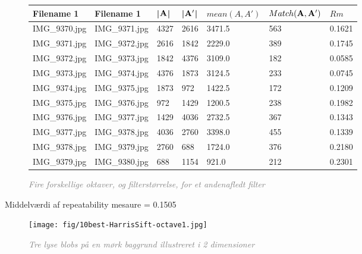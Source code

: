 \begin{figure}[H]
    \centering
    \begin{center}    
    \begin{tabular}{ | l | l | l | l | l | l | l |}
    \hline
    Filename 1 & Filename 1 & |$\bold{A}$| & |$\bold{A'}$| & $mean(A,A')$ & $Match(\bold{A}, \bold{A}')$ & $Rm$ \\ \hline
IMG\_9370.jpg &	IMG\_9371.jpg &	4327 &	2616 &	3471.5 &	563 &	0.1621\\ \hline
IMG\_9371.jpg &	IMG\_9372.jpg &	2616 &	1842 &	2229.0 &	389 &	0.1745\\ \hline
IMG\_9372.jpg &	IMG\_9373.jpg &	1842 &	4376 &	3109.0 &	182 &	0.0585\\ \hline
IMG\_9373.jpg &	IMG\_9374.jpg &	4376 &	1873 &	3124.5 &	233 &	0.0745\\ \hline
IMG\_9374.jpg &	IMG\_9375.jpg &	1873 &	972 &	1422.5 &	172 &	0.1209\\ \hline
IMG\_9375.jpg &	IMG\_9376.jpg &	972 &	1429 &	1200.5 &	238 &	0.1982\\ \hline
IMG\_9376.jpg &	IMG\_9377.jpg &	1429 &	4036 &	2732.5 &	367 &	0.1343\\ \hline
IMG\_9377.jpg &	IMG\_9378.jpg &	4036 &	2760 &	3398.0 &	455 &	0.1339\\ \hline
IMG\_9378.jpg &	IMG\_9379.jpg &	2760 &	688 &	1724.0 &	376 &	0.2180\\ \hline
IMG\_9379.jpg &	IMG\_9380.jpg &	688 &	1154 &	921.0  &	212 &	0.2301\\ \hline
    \end{tabular}       
    \caption{\textcolor{gray}{\footnotesize \textit{Fire forskellige oktaver, og filterstørrelse, for et andenafledt filter}}}
    \label{tab:HARRISOCTAVE2}
     \end{center}
     \vspace{-2.5em}
\end{figure} \noindent
Middelværdi af repeatability mesaure  = 0.1505


\begin{figure}[H]
    \centering
    \texttt{[image: fig/10best-HarrisSift-octave1.jpg]}
    \vspace{-0.5em}   
    \begin{center}
    \caption{\textcolor{gray}{\footnotesize \textit{
    Tre lyse blobs på en mørk baggrund illustreret i 2 dimensioner \cite{blob}}}}
    \label{fig:lindblob}
     \end{center}
  \end{figure}
       \vspace{-2.7em}
\noindent





